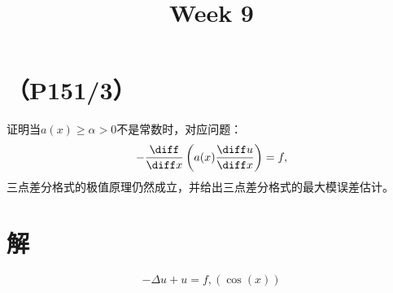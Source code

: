 \documentclass{homework}
\title{Week 9}
\date{}
\begin{document}
\maketitle
\section{（P151/3）}
证明当$a(x)\geqslant\alpha>0$不是常数时，对应问题：$$-\frac{\diff}{\diff x}\left(a(x)\frac{\diff u}{\diff x}\right)=f,$$三点差分格式的极值原理仍然成立，并给出三点差分格式的最大模误差估计。
\section{解}
$$-\Delta u+u=f,(\cos(x))$$
\end{document}
